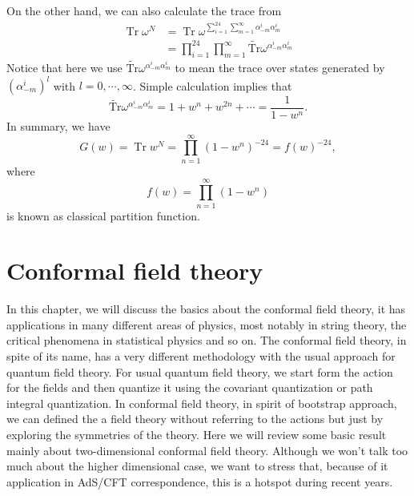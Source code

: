 \documentclass[graybox,envcountchap,sectrefs]{svmono}
\begin{document}
On the other hand, we can also calculate the trace from
\begin{equation}
\begin{aligned}
\operatorname{Tr} \omega^{N} &=\operatorname{Tr} \omega^{ \sum_{i=1}^{24} \sum_{m=1}^{\infty} \alpha_{-m}^{i} \alpha_{m}^{i}}\\
&=\prod^{24}_{i=1} \prod_{m=1}^{\infty} \operatorname{\tilde{Tr}}\omega^{\alpha_{-m}^{i} \alpha_{m}^{i}}
\end{aligned}
\end{equation}
Notice that here we use $\operatorname{\tilde{Tr}}\omega^{\alpha_{-m}^{i} \alpha_{m}^{i}}$ to mean the trace over states generated by $(\alpha_{-m}^i)^l$ with $l=0,\cdots,\infty$. Simple calculation implies that 
\begin{equation}
\operatorname{\tilde{Tr}}\omega^{\alpha_{-m}^{i} \alpha_{m}^{i}}=1+w^n+w^{2n}+\cdots =\frac{1}{1-w^n}.
\end{equation}
In summary, we have
\begin{equation}
G(w)=\operatorname{Tr} w^N=\prod_{n=1}^{\infty}	(1-w^n)^{-24}=f(w)^{-24},
\end{equation}
where 
\begin{equation}
f(w)=\prod_{n=1}^{\infty}(1-w^n)
\end{equation}
is known as classical partition function.

\chapter{Conformal field theory}

In this chapter, we will discuss the basics about the conformal field theory, it has applications in many different areas of physics, most notably in string theory, the critical phenomena in statistical physics and so on. The conformal field theory, in spite of its name, has a very different methodology with the usual approach for quantum field theory. For usual quantum field theory, we start form the action for the fields and then quantize it using the covariant quantization or path integral quantization. In conformal field theory, in spirit of bootstrap approach, we can defined the a field theory without referring to the actions but just by exploring the symmetries of the theory. Here we will review some basic result mainly about two-dimensional conformal field theory. Although we won't talk too much about the higher dimensional case, we want to stress that, because of it application in AdS/CFT correspondence, this is a hotspot during recent years.
\end{document}
